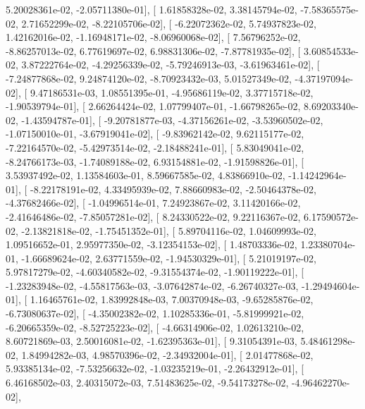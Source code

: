 \documentclass{article}
\begin{document}
          5.20028361e-02,  -2.05711380e-01],
       [  1.61858328e-02,   3.38145794e-02,  -7.58365575e-02,
          2.71652299e-02,  -8.22105706e-02],
       [ -6.22072362e-02,   5.74937823e-02,   1.42162016e-02,
         -1.16948171e-02,  -8.06960068e-02],
       [  7.56796252e-02,  -8.86257013e-02,   6.77619697e-02,
          6.98831306e-02,  -7.87781935e-02],
       [  3.60854533e-02,   3.87222764e-02,  -4.29256339e-02,
         -5.79246913e-03,  -3.61963461e-02],
       [ -7.24877868e-02,   9.24874120e-02,  -8.70923432e-03,
          5.01527349e-02,  -4.37197094e-02],
       [  9.47186531e-03,   1.08551395e-01,  -4.95686119e-02,
          3.37715718e-02,  -1.90539794e-01],
       [  2.66264424e-02,   1.07799407e-01,  -1.66798265e-02,
          8.69203340e-02,  -1.43594787e-01],
       [ -9.20781877e-03,  -4.37156261e-02,  -3.53960502e-02,
         -1.07150010e-01,  -3.67919041e-02],
       [ -9.83962142e-02,   9.62115177e-02,  -7.22164570e-02,
         -5.42973514e-02,  -2.18488241e-01],
       [  5.83049041e-02,  -8.24766173e-03,  -1.74089188e-02,
          6.93154881e-02,  -1.91598826e-01],
       [  3.53937492e-02,   1.13584603e-01,   8.59667585e-02,
          4.83866910e-02,  -1.14242964e-01],
       [ -8.22178191e-02,   4.33495939e-02,   7.88660983e-02,
         -2.50464378e-02,  -4.37682466e-02],
       [ -1.04996514e-01,   7.24923867e-02,   3.11420166e-02,
         -2.41646486e-02,  -7.85057281e-02],
       [  8.24330522e-02,   9.22116367e-02,   6.17590572e-02,
         -2.13821818e-02,  -1.75451352e-01],
       [  5.89704116e-02,   1.04609993e-02,   1.09516652e-01,
          2.95977350e-02,  -3.12354153e-02],
       [  1.48703336e-02,   1.23380704e-01,  -1.66689624e-02,
          2.63771559e-02,  -1.94530329e-01],
       [  5.21019197e-02,   5.97817279e-02,  -4.60340582e-02,
         -9.31554374e-02,  -1.90119222e-01],
       [ -1.23283948e-02,  -4.55817563e-03,  -3.07642874e-02,
         -6.26740327e-03,  -1.29494604e-01],
       [  1.16465761e-02,   1.83992848e-03,   7.00370948e-03,
         -9.65285876e-02,  -6.73080637e-02],
       [ -4.35002382e-02,   1.10285336e-01,  -5.81999921e-02,
         -6.20665359e-02,  -8.52725223e-02],
       [ -4.66314906e-02,   1.02613210e-02,   8.60721869e-03,
          2.50016081e-02,  -1.62395363e-01],
       [  9.31054391e-03,   5.48461298e-02,   1.84994282e-03,
          4.98570396e-02,  -2.34932004e-01],
       [  2.01477868e-02,   5.93385134e-02,  -7.53256632e-02,
         -1.03235219e-01,  -2.26432912e-01],
       [  6.46168502e-03,   2.40315072e-03,   7.51483625e-02,
         -9.54173278e-02,  -4.96462270e-02],
\end{document}
